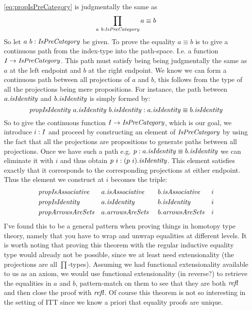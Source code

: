 \ref{eq:propIsPreCategory} is judgmentally the same as
%
$$
\prod_{a\ b \tp \IsPreCategory} a \equiv b
$$
%
So let $a\ b \tp \IsPreCategory$ be given. To prove the equality $a \equiv b$ is
to give a continuous path from the index-type into the path-space. I.e. a
function $I \to \IsPreCategory$. This path must satisfy being being judgmentally
the same as $a$ at the left endpoint and $b$ at the right endpoint. We know we
can form a continuous path between all projections of $a$ and $b$, this follows
from the type of all the projections being mere propositions. For instance, the
path between $a.\isIdentity$ and $b.\isIdentity$ is simply formed by:
%
$$
\propIsIdentity\ a.\isIdentity\ b.\isIdentity
\tp
a.\isIdentity \equiv b.\isIdentity
$$
%
So to give the continuous function $I \to \IsPreCategory$, which is our goal, we
introduce $i \mathrel{:} I$ and proceed by constructing an element of $\IsPreCategory$
by using the fact that all the projections are propositions to generate paths
between all projections. Once we have such a path e.g. $p \tp a.\isIdentity
\equiv b.\isIdentity$ we can eliminate it with $i$ and thus obtain $p\ i \tp
(p\ i).\isIdentity$. This element satisfies exactly that it corresponds to the
corresponding projections at either endpoint. Thus the element we construct at
$i$ becomes the triple:
%
\begin{equation}
\label{eq:proof-prop-IsPreCategory}
\begin{aligned}
  & \var{propIsAssociative} && a.\var{isAssociative}\
       && b.\var{isAssociative} && i  \\
  & \propIsIdentity    && a.\isIdentity\
       && b.\isIdentity    && i  \\
  & \var{propArrowsAreSets} && a.\var{arrowsAreSets}\
       && b.\var{arrowsAreSets} && i
\end{aligned}
\end{equation}
%
I've found this to be a general pattern when proving things in homotopy type
theory, namely that you have to wrap and unwrap equalities at different levels.
It is worth noting that proving this theorem with the regular inductive equality
type would already not be possible, since we at least need extensionality (the
projections are all $\prod$-types). Assuming we had functional extensionality
available to us as an axiom, we would use functional extensionality (in
reverse?) to retrieve the equalities in $a$ and $b$, pattern-match on them to
see that they are both $\refl$ and then close the proof with $\refl$.
Of course this theorem is not so interesting in the setting of ITT since we know
a priori that equality proofs are unique.

